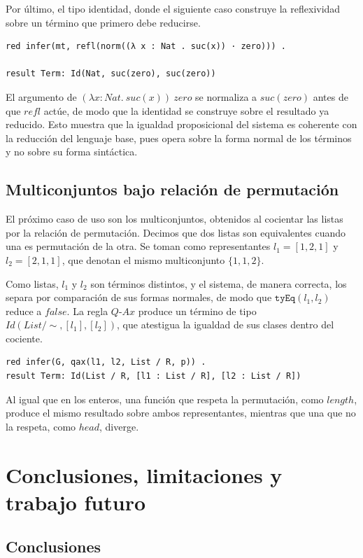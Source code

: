 Por último, el tipo identidad, donde el siguiente caso construye la reflexividad sobre un término que primero debe reducirse.

\begin{lstlisting}
red infer(mt, refl(norm((λ x : Nat . suc(x)) · zero))) .

result Term: Id(Nat, suc(zero), suc(zero))
\end{lstlisting}

El argumento de $(\lambda x : Nat.\ suc(x))\ zero$ se normaliza a $suc(zero)$ antes de que $refl$ actúe, de modo que la identidad se construye sobre el resultado ya reducido. Esto muestra que la igualdad proposicional del sistema es coherente con la reducción del lenguaje base, pues opera sobre la forma normal de los términos y no sobre su forma sintáctica.

\section{Multiconjuntos bajo relación de permutación}

El próximo caso de uso son los multiconjuntos, obtenidos al cocientar las listas por la relación de permutación. Decimos que dos listas son equivalentes cuando una es permutación de la otra. Se toman como representantes $l_1 = [1,2,1]$ y $l_2 = [2,1,1]$, que denotan el mismo multiconjunto $\{1,1,2\}$.

Como listas, $l_1$ y $l_2$ son términos distintos, y el sistema, de manera correcta, los separa por comparación de sus formas normales, de modo que $\texttt{tyEq}(l_1, l_2)$ reduce a $\mathit{false}$. La regla $Q\text{-}Ax$ produce un término de tipo $Id(List / {\sim}, [l_1], [l_2])$, que atestigua la igualdad de sus clases dentro del cociente.

\begin{lstlisting}
red infer(G, qax(l1, l2, List / R, p)) .
result Term: Id(List / R, [l1 : List / R], [l2 : List / R])
\end{lstlisting}

Al igual que en los enteros, una función que respeta la permutación, como $length$, produce el mismo resultado sobre ambos representantes, mientras que una que no la respeta, como $head$, diverge.
\chapter{Conclusiones, limitaciones y trabajo futuro}\label{ch:concl}

\section{Conclusiones}

